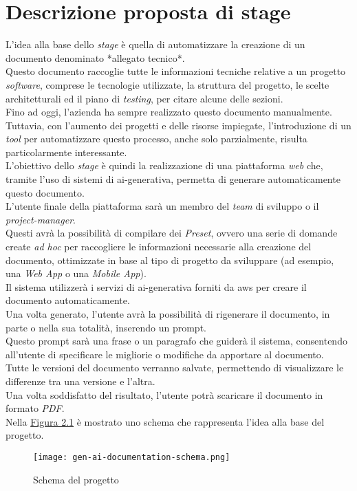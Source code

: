 \section{Descrizione proposta di stage}
\label{sez:descrizione-stage}

L'idea alla base dello \textit{stage} è quella di automatizzare la creazione di un documento denominato *allegato tecnico*.\\  
Questo documento raccoglie tutte le informazioni tecniche relative a un progetto \textit{software}, comprese le tecnologie utilizzate,
la struttura del progetto, le scelte architetturali ed il piano di \textit{testing}, per citare alcune delle sezioni.\\  
Fino ad oggi, l'azienda ha sempre realizzato questo documento manualmente.\\
Tuttavia, con l'aumento dei progetti e delle risorse impiegate,
l'introduzione di un \textit{tool} per automatizzare questo processo, anche solo parzialmente, risulta particolarmente interessante.\\  

\noindent L'obiettivo dello \textit{stage} è quindi la realizzazione di una piattaforma \textit{web} che, tramite l'uso di sistemi di \gls{ai-generativa},  
permetta di generare automaticamente questo documento.\\  
L'utente finale della piattaforma sarà un membro del \textit{team} di sviluppo o il \textit{project-manager}.\\  
Questi avrà la possibilità di compilare dei \textit{Preset}, ovvero una serie di domande create \textit{ad hoc}
per raccogliere le informazioni necessarie alla creazione del documento, ottimizzate in base al tipo di progetto da sviluppare (ad esempio, una \textit{Web App} o una \textit{Mobile App}).\\  
Il sistema utilizzerà i servizi di \gls{ai-generativa} forniti da \gls{aws} per creare il documento automaticamente.\\  

\noindent Una volta generato, l'utente avrà la possibilità di rigenerare il documento, in parte o nella sua totalità, inserendo un \gls{prompt}.\\  
Questo \gls{prompt} sarà una frase o un paragrafo che guiderà il sistema, consentendo all'utente di specificare le migliorie o modifiche da apportare al documento.\\  
Tutte le versioni del documento verranno salvate, permettendo di visualizzare le differenze tra una versione e l'altra.\\  
Una volta soddisfatto del risultato, l'utente potrà scaricare il documento in formato \textit{PDF}.\\  
Nella {\hyperref[fig:project-schema]{Figura 2.1}} è mostrato uno schema che rappresenta l'idea alla base del progetto.\\  


\begin{figure}[H]
    \label{fig:project-schema}
    \centering
    \texttt{[image: gen-ai-documentation-schema.png]}
    \caption{Schema del progetto}
\end{figure}